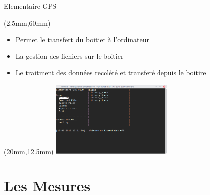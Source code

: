 \documentclass[10pt]{beamer}
\begin{document}
	\begin{frame}{Elementaire GPS}
		\begin{textblock*}{80mm}(2.5mm,60mm)
			\begin{itemize}
				\item Permet le transfert du boitier à l'ordinateur 
				\item La gestion des fichiers sur le boitier 
				\item Le traitment des données recolété et transferé depuis le boitire
			\end{itemize}
		\end{textblock*}

		\begin{textblock*}{80mm}(20mm,12.5mm)
				\includegraphics[width=225px]{elementaire_gps.png}
		\end{textblock*}
		
	\end{frame}

	\section{Les Mesures}
\end{document}
